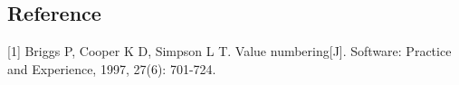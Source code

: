 \subsection*{Reference}

[1] Briggs P, Cooper K D, Simpson L T. Value numbering[J]. Software: Practice and Experience, 1997, 27(6): 701-724.
